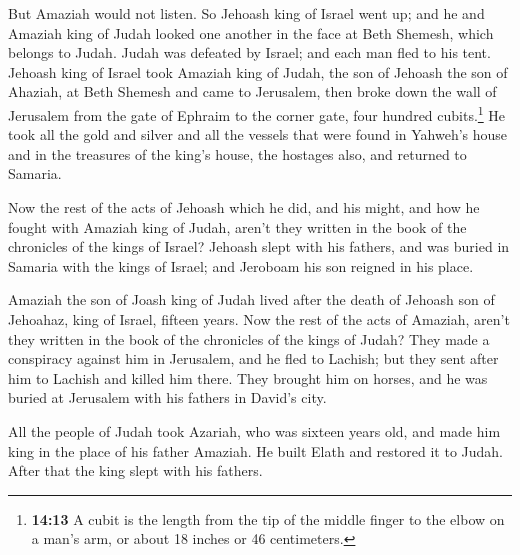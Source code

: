  But Amaziah would not listen. So Jehoash king of Israel
went up; and he and Amaziah king of Judah looked one another in the face
at Beth Shemesh, which belongs to Judah.  Judah was
defeated by Israel; and each man fled to his tent. 
Jehoash king of Israel took Amaziah king of Judah, the son of Jehoash
the son of Ahaziah, at Beth Shemesh and came to Jerusalem, then broke
down the wall of Jerusalem from the gate of Ephraim to the corner gate,
four hundred cubits.\footnote{\textbf{14:13} A cubit is the length from
  the tip of the middle finger to the elbow on a man's arm, or about 18
  inches or 46 centimeters.}  He took all the gold and
silver and all the vessels that were found in Yahweh's house and in the
treasures of the king's house, the hostages also, and returned to
Samaria.

 Now the rest of the acts of Jehoash which he did, and
his might, and how he fought with Amaziah king of Judah, aren't they
written in the book of the chronicles of the kings of Israel?
 Jehoash slept with his fathers, and was buried in
Samaria with the kings of Israel; and Jeroboam his son reigned in his
place.

 Amaziah the son of Joash king of Judah lived after the
death of Jehoash son of Jehoahaz, king of Israel, fifteen years.
 Now the rest of the acts of Amaziah, aren't they written
in the book of the chronicles of the kings of Judah? 
They made a conspiracy against him in Jerusalem, and he fled to Lachish;
but they sent after him to Lachish and killed him there. 
They brought him on horses, and he was buried at Jerusalem with his
fathers in David's city.

 All the people of Judah took Azariah, who was sixteen
years old, and made him king in the place of his father Amaziah.
 He built Elath and restored it to Judah. After that the
king slept with his fathers.

